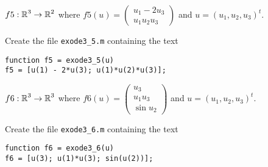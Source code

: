 \documentclass{ximera}
\begin{document}
\begin{exercise} \label{c11.3.2e}
$f5:\mbox{$\Bbb{R}$}^3\to\mbox{$\Bbb{R}$}^2$ where $f5(u)=\left(\begin{array}{c} u_1 -2u_3\\u_1 u_2 u_3\end{array}\right)$ and $u=(u_1,u_2,u_3)^t$.

\begin{solution}

Create the file {\tt exode3\_5.m} containing the text
\begin{verbatim}
function f5 = exode3_5(u)
f5 = [u(1) - 2*u(3); u(1)*u(2)*u(3)];
\end{verbatim}

\end{solution}
\end{exercise}
\begin{exercise} \label{c11.3.2f}
$f6:\mbox{$\Bbb{R}$}^3\to\mbox{$\Bbb{R}$}^3$ where $f6(u)=\left(\begin{array}{c} u_3\\u_1 u_3\\ 
\sin u_2\end{array}\right)$ and $u=(u_1,u_2,u_3)^t$.

\begin{solution}

Create the file {\tt exode3\_6.m} containing the text
\begin{verbatim}
function f6 = exode3_6(u)
f6 = [u(3); u(1)*u(3); sin(u(2))];
\end{verbatim}


\end{solution}
\end{exercise}
\end{document}
